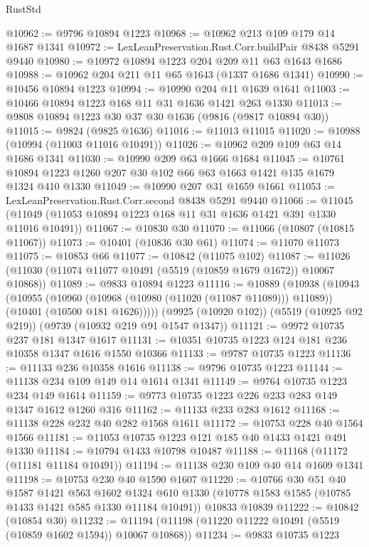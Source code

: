 \begin{lexlean}{RustStd}
\begin{coremodule}
@10962 := @9796 @10894 @1223
@10968 := @10962 @213 @109 @179 @14 @1687 @1341
@10972 := LexLeanPreservation.Rust.Corr.buildPair @8438 @5291 @9440
@10980 := @10972 @10894 @1223 @204 @209 @11 @63 @1643 @1686
@10988 := @10962 @204 @211 @11 @65 @1643 (@1337 @1686 @1341)
@10990 := @10456 @10894 @1223
@10994 := @10990 @204 @11 @1639 @1641
@11003 := @10466 @10894 @1223 @168 @11 @31 @1636 @1421 @263 @1330
@11013 := @9808 @10894 @1223 @30 @37 @30 @1636 (@9816 (@9817 @10894 @30))
@11015 := @9824 (@9825 @1636)
@11016 := @11013 @11015
@11020 := @10988 (@10994 (@11003 @11016 @10491))
@11026 := @10962 @209 @109 @63 @14 @1686 @1341
@11030 := @10990 @209 @63 @1666 @1684
@11045 := @10761 @10894 @1223 @1260 @207 @30 @102 @66 @63 @1663 @1421 @135 @1679 @1324 @410 @1330
@11049 := @10990 @207 @31 @1659 @1661
@11053 := LexLeanPreservation.Rust.Corr.second @8438 @5291 @9440
@11066 := @11045 (@11049 (@11053 @10894 @1223 @168 @11 @31 @1636 @1421 @391 @1330 @11016 @10491))
@11067 := @10830 @30
@11070 := @11066 (@10807 (@10815 @11067))
@11073 := @10401 (@10836 @30 @61)
@11074 := @11070 @11073
@11075 := @10853 @66
@11077 := @10842 (@11075 @102)
@11087 := @11026 (@11030 (@11074 @11077 @10491 (@5519 (@10859 @1679 @1672)) @10067 @10868))
@11089 := @9833 @10894 @1223
@11116 := @10889
    (@10938
      (@10943
        (@10955
          (@10960 (@10968 (@10980 (@11020 (@11087 @11089))) @11089))
          (@10401 (@10500 @181 @1626)))))
    (@9925 (@10920 @102))
    (@5519 (@10925 @92 @219))
    (@9739 (@10932 @219 @91 @1547 @1347))
@11121 := @9972 @10735 @237 @181 @1347 @1617
@11131 := @10351 @10735 @1223 @124 @181 @236 @10358 @1347 @1616 @1550 @10366
@11133 := @9787 @10735 @1223
@11136 := @11133 @236 @10358 @1616
@11138 := @9796 @10735 @1223
@11144 := @11138 @234 @109 @149 @14 @1614 @1341
@11149 := @9764 @10735 @1223 @234 @149 @1614
@11159 := @9773 @10735 @1223 @226 @233 @283 @149 @1347 @1612 @1260 @316
@11162 := @11133 @233 @283 @1612
@11168 := @11138 @228 @232 @40 @282 @1568 @1611
@11172 := @10753 @228 @40 @1564 @1566
@11181 := @11053 @10735 @1223 @121 @185 @40 @1433 @1421 @491 @1330
@11184 := @10794 @1433 @10798 @10487
@11188 := @11168 (@11172 (@11181 @11184 @10491))
@11194 := @11138 @230 @109 @40 @14 @1609 @1341
@11198 := @10753 @230 @40 @1590 @1607
@11220 := @10766
    @30
    @51
    @40
    @1587
    @1421
    @563
    @1602
    @1324
    @610
    @1330
    (@10778 @1583 @1585 (@10785 @1433 @1421 @585 @1330 @11184 @10491))
    @10833
    @10839
@11222 := @10842 (@10854 @30)
@11232 := @11194 (@11198 (@11220 @11222 @10491 (@5519 (@10859 @1602 @1594)) @10067 @10868))
@11234 := @9833 @10735 @1223

\end{coremodule}
\end{lexlean}
